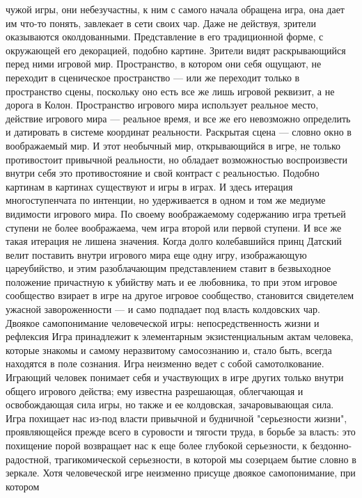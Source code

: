 \documentclass[12pt]{article}
\begin{document}
чужой игры, они небезучастны, к ним с самого начала обращена игра, она дает им что-то понять, завлекает в
сети своих чар. Даже не действуя, зрители оказываются околдованными. Представление в его традиционной
форме, с окружающей его декорацией, подобно картине. Зрители видят раскрывающийся перед ними игровой
мир. Пространство, в котором они себя ощущают, не переходит в сценическое пространство --- или же переходит
только  в  пространство  сцены,  поскольку  оно  есть  все  же  лишь  игровой  реквизит,  а  не  дорога  в  Колон.
Пространство игрового мира использует реальное место, действие игрового мира --- реальное время, и все же
его невозможно определить и датировать в системе координат реальности. Раскрытая сцена --- словно окно в
воображаемый  мир.  И  этот  необычный  мир,  открывающийся  в  игре,  не  только  противостоит  привычной
реальности,  но  обладает  возможностью  воспроизвести  внутри  себя  это  противостояние  и  свой  контраст  с 
реальностью. Подобно картинам в картинах существуют и игры в играх. И здесь итерация многоступенчата по
интенции, но удерживается в одном и том же медиуме видимости игрового мира. По своему воображаемому
содержанию игра третьей ступени не более воображаема, чем игра второй или первой ступени. И все же такая
итерация не лишена значения. Когда долго колебавшийся принц Датский велит поставить внутри игрового мира
еще одну игру, изображающую цареубийство, и этим разоблачающим представлением ставит в безвыходное
положение причастную к убийству мать и ее любовника, то при этом игровое сообщество взирает в игре на
другое игровое сообщество, становится свидетелем ужасной завороженности --- и само подпадает под власть
колдовских чар.
Двоякое самопонимание человеческой игры: непосредственность жизни и рефлексия
Игра принадлежит к элементарным экзистенциальным актам человека, которые знакомы и самому неразвитому
самосознанию и, стало быть, всегда находятся в поле сознания. Игра неизменно ведет с собой самотолкование.
Играющий человек понимает себя и участвующих в игре других только внутри общего игрового действа; ему
известна разрешающая, облегчающая и освобождающая сила игры, но также и ее колдовская, зачаровывающая
сила. Игра похищает нас из-под власти привычной и будничной "серьезности жизни", проявляющейся прежде
всего в суровости и тягости труда, в борьбе за власть: это похищение порой возвращает нас к еще более
глубокой серьезности, к бездонно-радостной, трагикомической серьезности, в которой мы созерцаем бытие
словно  в  зеркале.  Хотя  человеческой  игре  неизменно  присуще  двоякое  самопонимание,  при  котором
\end{document}
